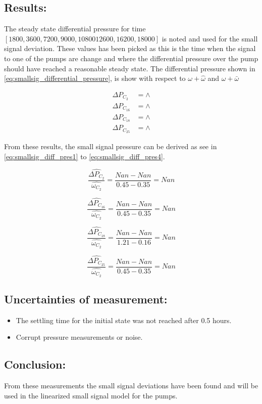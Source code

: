 \subsection*{Results:}
The steady state differential pressure for time $[1800, 3600, 7200, 9000, 10800 12600, 16200, 18000]$ is noted and used for the small signal deviation. These values has been picked as this is the time when the signal to one of the pumps are change and where the differential pressure over the pump should have reached a reasonable steady state. The differential pressure shown in \eqref{eq:smallsig_differential_pressure}, is show with respect to $\omega + \hat{\omega}$ and $\omega + \bar{\omega}$

\begin{equation}
	\begin{split}
	\Delta P_{C_2} &= \wedge \\
	\Delta P_{C_{16}} &= \wedge \\
	\Delta P_{C_{18}} &= \wedge \\
	\Delta P_{C_{25}} &= \wedge
	\end{split}
	\label{eq:smallsig_differential_pressure}
\end{equation}

From these results, the small signal pressure can be derived as see in \eqref{eq:smallsig_diff_pres1} to \eqref{eq:smallsig_diff_pres4}.

\begin{equation}
\frac{\hat{\Delta P_{C_2}}}{\hat{\omega_{C_2}}} = \frac{Nan-Nan}{0.45-0.35} = Nan 
\label{eq:smallsig_diff_pres1}
\end{equation}

\begin{equation}
\frac{\hat{\Delta P_{C_16}}}{\hat{\omega_{C_2}}} = \frac{Nan-Nan}{0.45-0.35} = Nan 
\label{eq:smallsig_diff_pres2}
\end{equation}

\begin{equation}
\frac{\hat{\Delta P_{C_18}}}{\hat{\omega_{C_2}}} = \frac{Nan-Nan}{1.21 - 0.16} = Nan 
\label{eq:smallsig_diff_pres3}
\end{equation}

\begin{equation}
\frac{\hat{\Delta P_{C_25}}}{\hat{\omega_{C_2}}} = \frac{Nan-Nan}{0.45-0.35} = Nan 
\label{eq:smallsig_diff_pres4}
\end{equation}


\subsection*{Uncertainties of measurement:}
\begin{itemize}
\item The settling time for the initial state was not reached after 0.5 hours.
\item Corrupt pressure measurements or noise. 
\end{itemize}

\subsection*{Conclusion:}
From these measurements the small signal deviations have been found and will be used in the linearized small signal model for the pumps. 


